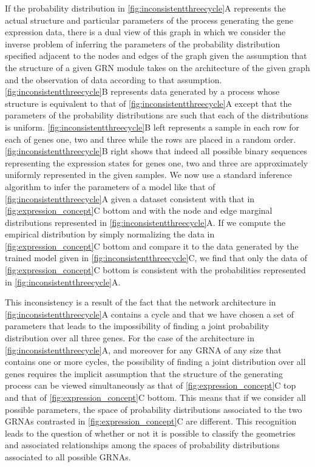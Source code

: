 If the probability distribution in \ref{fig:inconsistentthreecycle}A represents the actual structure and particular parameters of the process generating the gene expression data, there is a dual view of this graph in which we consider the inverse problem of inferring the parameters of the probability distribution specified adjacent to the nodes and edges of the graph given the assumption that the structure of a given GRN module takes on the architecture of the given graph and the observation of data according to that assumption. \ref{fig:inconsistentthreecycle}B represents data generated by a process whose structure is equivalent to that of \ref{fig:inconsistentthreecycle}A except that the parameters of the probability distributions are such that each of the distributions is uniform. \ref{fig:inconsistentthreecycle}B left represents a sample in each row for each of genes one, two and three while the rows are placed in a random order. \ref{fig:inconsistentthreecycle}B right shows that indeed all possible binary sequences representing the expression states for genes one, two and three are approximately uniformly represented in the given samples. We now use a standard inference algorithm \cite{Barber2012} to infer the parameters of a model like that of \ref{fig:inconsistentthreecycle}A given a dataset consistent with that in \ref{fig:expression_concept}C bottom and with the node and edge marginal distributions represented in \ref{fig:inconsistentthreecycle}A. If we compute the empirical distribution by simply normalizing the data in \ref{fig:expression_concept}C bottom and compare it to the data generated by the trained model given in \ref{fig:inconsistentthreecycle}C, we find that only the data of \ref{fig:expression_concept}C bottom is consistent with the probabilities represented in \ref{fig:inconsistentthreecycle}A.

This inconsistency is a result of the fact that the network architecture in \ref{fig:inconsistentthreecycle}A contains a cycle and that we have chosen a set of parameters that leads to the impossibility of finding a joint probability distribution over all three genes. For the case of the architecture in \ref{fig:inconsistentthreecycle}A, and moreover for any GRNA of any size that contains one or more cycles, the possibility of finding a joint distribution over all genes requires the implicit assumption that the structure of the generating process can be viewed simultaneously as that of \ref{fig:expression_concept}C top and that of \ref{fig:expression_concept}C bottom. This means that if we consider all possible parameters, the space of probability distributions associated to the two GRNAs contrasted in \ref{fig:expression_concept}C are different. This recognition leads to the question of whether or not it is possible to classify the geometries and associated relationships among the spaces of probability distributions associated to all possible GRNAs.

